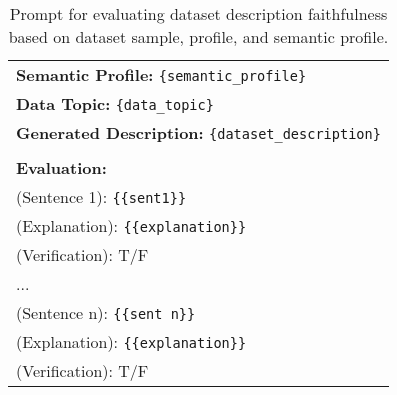 \begin{table*}
\begin{tabular}{p{14cm}}
    \textbf{Semantic Profile:} \texttt{\{semantic\_profile\}} \\
    \textbf{Data Topic:} \texttt{\{data\_topic\}} \\
    \textbf{Generated Description:} \texttt{\{dataset\_description\}} \\
    \\
    \textbf{Evaluation:} \\
    (Sentence 1): \texttt{\{\{sent1\}\}} \\
    (Explanation): \texttt{\{\{explanation\}\}} \\
    (Verification): T/F \\
    ... \\
    (Sentence n): \texttt{\{\{sent n\}\}} \\
    (Explanation): \texttt{\{\{explanation\}\}} \\
    (Verification): T/F \\
    \bottomrule
    \end{tabular}
    \caption{Prompt for evaluating dataset description faithfulness based on dataset sample, profile, and semantic profile.}
    \label{tab:faithfulness_evaluation}
\end{table*}


